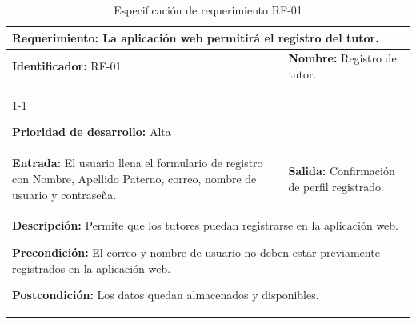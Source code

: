 \begin{table}[H]
\caption{Especificación de requerimiento RF-01}
\centering
\renewcommand{\arraystretch}{1.3}
\setlength{\tabcolsep}{6pt}

\begin{tabular}{|p{7cm}|p{8cm}|}
\hline

\multicolumn{2}{|p{15cm}|}{\textbf{Requerimiento:} La aplicación web permitirá el registro del tutor.} \\ \hline

\textbf{Identificador:} RF-01 &
\textbf{Nombre:} Registro de tutor. \\ \cline{1-1}

\textbf{Prioridad de desarrollo:} Alta &
\multicolumn{1}{p{8cm}|}{} \\ \hline
\textbf{Entrada:} El usuario llena el formulario de registro con Nombre, Apellido Paterno, correo, nombre de usuario y contraseña. &
\textbf{Salida:} Confirmación de perfil registrado. \\ \hline

\multicolumn{2}{|p{15cm}|}{
\textbf{Descripción:} Permite que los tutores puedan registrarse en la aplicación web.

\vspace{0.2cm}

\textbf{Precondición:} El correo y nombre de usuario no deben estar previamente registrados en la aplicación web.

\vspace{0.2cm}

\textbf{Postcondición:} Los datos quedan almacenados y disponibles.
} \\ \hline

\end{tabular}

\label{tab:rf2}

\end{table}

